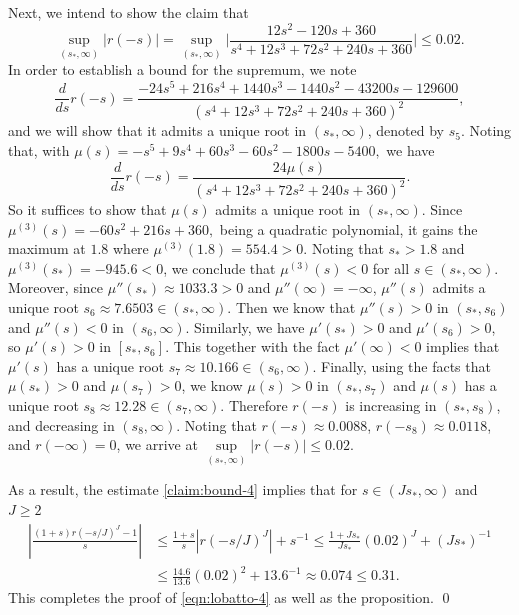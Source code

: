 \documentclass[a4paper, oneside]{book}
\begin{document}
Next, we intend to show the claim that
\begin{equation}\label{claim:bound-4}
 \sup\limits_{(s_*, \infty)}
   \big|r(-s)\big| =   \sup\limits_{(s_*, \infty)}  \big|\frac{12s^2-120s+360}{s^4+12s^3+72s^2 + 240s + 360}\Big| \le  0.02.
\end{equation}
In order to establish a bound for the supremum, we note
$$\frac{d}{ds}r(-s)
= \frac{-24s^5+216s^4+1440s^3-1440s^2-43200s-129600}
{(s^4+12s^3+72s^2 + 240s + 360)^2}, $$
and we will show that it admits a unique root in $(s_*, \infty)$,
denoted by $s_5$. Noting that, with
$\mu(s) = -s^5+9s^4+60s^3-60s^2-1800s-5400, $
we have
$$\frac{d}{ds}r(-s) = \frac{24\mu(s)}{(s^4+12s^3+72s^2 + 240s + 360)^2}.$$
So it suffices to show that $\mu(s)$ admits a unique  root in $(s_*, \infty)$. Since
$\mu^{(3)}(s)=-60s^2+216s+360,$ being a quadratic polynomial,
it gains the maximum at $1.8$ where
$\mu^{(3)}(1.8) = 554.4>0$.
Noting that $s_*>1.8$ and $\mu^{(3)}(s_*)=-945.6<0$,
we conclude that $\mu^{(3)}(s)<0$ for all $s\in(s_*, \infty)$.
Moreover, since $\mu''(s_*) \approx 1033.3 >0$ and $\mu''(\infty) =-\infty$, $\mu''(s)$ admits a unique root $s_6\approx 7.6503 \in (s_*, \infty)$. Then we know that $\mu''(s) > 0$ in $(s_*, s_6)$
and $\mu''(s) < 0$ in $(s_6, \infty)$.
Similarly, we have $\mu'(s_*) >0$ and $\mu'(s_6) >0$,
so  $\mu'(s) > 0$ in $[s_*, s_6]$. This together with the fact  $\mu'(\infty) <0$ implies that
$\mu'(s)$ has a unique root $s_7\approx 10.166 \in (s_6, \infty)$.
Finally, using the facts that $\mu(s_*)>0$ and $\mu(s_7)>0$,
we know $\mu(s) >0 $ in  $(s_*, s_7)$ and
 $\mu(s)$ has a unique root $s_8 \approx 12.28 \in (s_7, \infty)$.
Therefore $r(-s)$ is increasing in $(s_*, s_8)$,
and decreasing in $(s_8, \infty)$.
Noting that $r(-s)\approx 0.0088$, $r(-s_8)\approx 0.0118$, and $r(-\infty)=0$, we arrive at
$\sup\limits_{(s_*, \infty)}
\big|r(-s)\big| \le 0.02.$


As a result, the estimate \eqref{claim:bound-4} implies that
for $s\in (Js_*,\infty)$ and $J\ge 2$
\begin{equation*}
\begin{split}
    \left|\frac{(1+s) r(-s/J)^J-1}{s}\right|
    &\le \frac{1+s}{s}|r(-s/J)^J|+s^{-1}
    \le \frac{1+Js_*}{Js_*} (0.02)^J + (Js_*)^{-1}    \\
    &\le  \frac{14.6}{13.6} (0.02)^2 + 13.6^{-1}
    \approx 0.074 \le 0.31.
\end{split}
\end{equation*}
This completes the proof of \eqref{eqn:lobatto-4} as well as the proposition.
\qed
\end{document}
